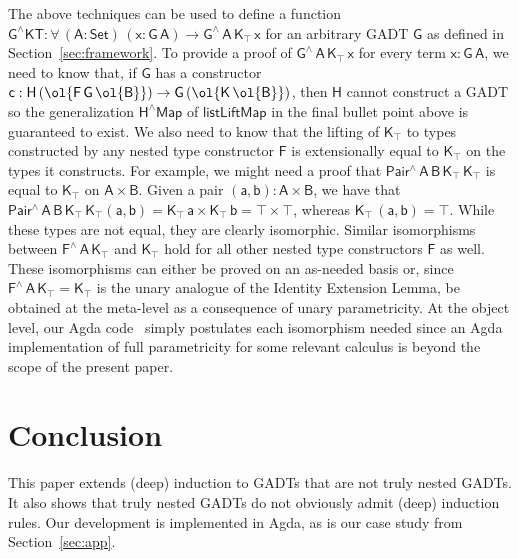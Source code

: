 \documentclass[9pt]{entcs}
\begin{document}
The above techniques can be used to define a function
$\mathsf{G^\wedge KT : \forall\, (A : Set)\, (x : G\,A) \to
  G^{\wedge}\, A\, K_\top\, x}$ for an arbitrary GADT $\mathsf{G}$ as
defined in Section~\ref{sec:framework}.  To provide a proof of
$\mathsf{G^{\wedge}\, A\, K_\top \, x}$ for every term $\mathsf{x :
  G\, A}$, we need to know that, if $\mathsf{G}$ has a constructor
$\mathsf{c : H \, (\ol{F\,G\, \ol{B}}) \to G\, (\ol{K\,\ol{B}})}$,
then $\mathsf{H}$ cannot construct a GADT so the generalization
$\mathsf{H^\wedge Map}$ of $\mathsf{listLiftMap}$ in the final bullet
point above is guaranteed to exist. We also need to know that the
lifting of $\mathsf{K_\top}$ to types constructed by any nested type
constructor $\mathsf{F}$ is extensionally equal to $\mathsf{K_\top}$
on the types it constructs. For example, we might need a proof that
$\mathsf{Pair^{\wedge}\,A\,B\,K_\top\,K_\top}$ is equal to
$\mathsf{K_\top}$ on $\mathsf{A \times B}$.  Given a pair $\mathsf{(a
  , b) : A \times B}$, we have that
$\mathsf{Pair^{\wedge}\,A\,B\,K_\top\,K_\top (a, b) = K_\top \, a
  \times K_\top\, b = \top \times \top}$, whereas $\mathsf{K_\top\,
  (a, b) = \top}$. While these types are not equal, they are clearly
isomorphic. Similar isomorphisms between
$\mathsf{F^{\wedge}\,A\,K_\top}$ and $\mathsf{K_\top}$ hold for all
other nested type constructors $\mathsf{F}$ as well. These
isomorphisms can either be proved on an as-needed basis or, since
$\mathsf{F^\wedge\,A\,K_\top = K_\top}$ is the unary analogue of the
Identity Extension Lemma, be obtained at the meta-level as a
consequence of unary parametricity. At the object level, our Agda
code~\cite{web-page} simply postulates each isomorphism needed since
an Agda implementation of full parametricity for some relevant
calculus is beyond the scope of the present paper.

\section{Conclusion}\label{sec:conclusion}

This paper extends (deep) induction to GADTs that are not truly nested
GADTs. It also shows that truly nested GADTs do not obviously admit
(deep) induction rules. Our development is implemented in Agda, as is
our case study from Section~\ref{sec:app}.

\pagebreak
\end{document}
